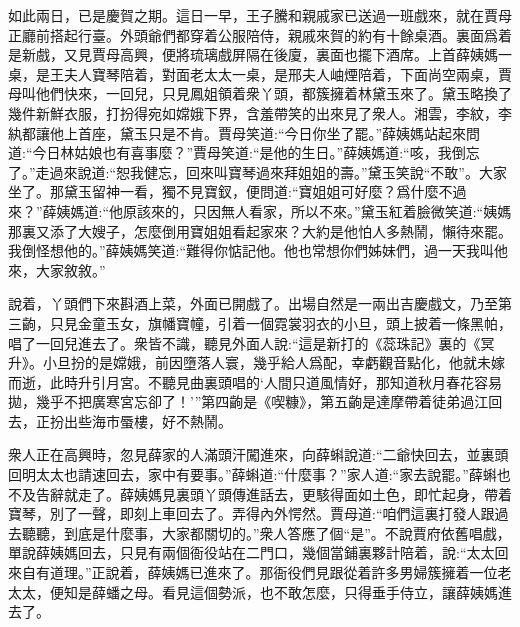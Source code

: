 \begin{parag}
    如此兩日，已是慶賀之期。這日一早，王子騰和親戚家已送過一班戲來，就在賈母正廳前搭起行臺。外頭爺們都穿着公服陪侍，親戚來賀的約有十餘桌酒。裏面爲着是新戲，又見賈母高興，便將琉璃戲屏隔在後廈，裏面也擺下酒席。上首薛姨媽一桌，是王夫人寶琴陪着，對面老太太一桌，是邢夫人岫煙陪着，下面尚空兩桌，賈母叫他們快來，一回兒，只見鳳姐領着衆丫頭，都簇擁着林黛玉來了。黛玉略換了幾件新鮮衣服，打扮得宛如嫦娥下界，含羞帶笑的出來見了衆人。湘雲，李紋，李紈都讓他上首座，黛玉只是不肯。賈母笑道:“今日你坐了罷。”薛姨媽站起來問道:“今日林姑娘也有喜事麼？”賈母笑道:“是他的生日。”薛姨媽道:“咳，我倒忘了。”走過來說道:“恕我健忘，回來叫寶琴過來拜姐姐的壽。”黛玉笑說“不敢”。大家坐了。那黛玉留神一看，獨不見寶釵，便問道:“寶姐姐可好麼？爲什麼不過來？”薛姨媽道:“他原該來的，只因無人看家，所以不來。”黛玉紅着臉微笑道:“姨媽那裏又添了大嫂子，怎麼倒用寶姐姐看起家來？大約是他怕人多熱鬧，懶待來罷。我倒怪想他的。”薛姨媽笑道:“難得你惦記他。他也常想你們姊妹們，過一天我叫他來，大家敘敘。”
\end{parag}


\begin{parag}
    說着，丫頭們下來斟酒上菜，外面已開戲了。出場自然是一兩出吉慶戲文，乃至第三齣，只見金童玉女，旗幡寶幢，引着一個霓裳羽衣的小旦，頭上披着一條黑帕，唱了一回兒進去了。衆皆不識，聽見外面人說:“這是新打的《蕊珠記》裏的《冥升》。小旦扮的是嫦娥，前因墮落人寰，幾乎給人爲配，幸虧觀音點化，他就未嫁而逝，此時升引月宮。不聽見曲裏頭唱的‘人間只道風情好，那知道秋月春花容易拋，幾乎不把廣寒宮忘卻了！’”第四齣是《喫糠》，第五齣是達摩帶着徒弟過江回去，正扮出些海市蜃樓，好不熱鬧。
\end{parag}


\begin{parag}
    衆人正在高興時，忽見薛家的人滿頭汗闖進來，向薛蝌說道:“二爺快回去，並裏頭回明太太也請速回去，家中有要事。”薛蝌道:“什麼事？”家人道:“家去說罷。”薛蝌也不及告辭就走了。薛姨媽見裏頭丫頭傳進話去，更駭得面如土色，即忙起身，帶着寶琴，別了一聲，即刻上車回去了。弄得內外愕然。賈母道:“咱們這裏打發人跟過去聽聽，到底是什麼事，大家都關切的。”衆人答應了個“是”。不說賈府依舊唱戲，單說薛姨媽回去，只見有兩個衙役站在二門口，幾個當鋪裏夥計陪着，說:“太太回來自有道理。”正說着，薛姨媽已進來了。那衙役們見跟從着許多男婦簇擁着一位老太太，便知是薛蟠之母。看見這個勢派，也不敢怎麼，只得垂手侍立，讓薛姨媽進去了。
\end{parag}


